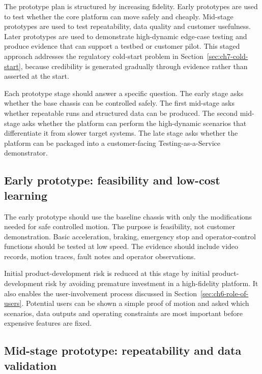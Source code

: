The prototype plan is structured by increasing fidelity. Early prototypes are used to test whether the core platform can move safely and cheaply. Mid-stage prototypes are used to test repeatability, data quality and customer usefulness. Later prototypes are used to demonstrate high-dynamic edge-case testing and produce evidence that can support a testbed or customer pilot. This staged approach addresses the regulatory cold-start problem in Section~\ref{sec:ch7-cold-start}, because credibility is generated gradually through evidence rather than asserted at the start.

Each prototype stage should answer a specific question. The early stage asks whether the base chassis can be controlled safely. The first mid-stage asks whether repeatable runs and structured data can be produced. The second mid-stage asks whether the platform can perform the high-dynamic scenarios that differentiate it from slower target systems. The late stage asks whether the platform can be packaged into a customer-facing Testing-as-a-Service demonstrator.

\subsection{Early prototype: feasibility and low-cost learning}
\label{sec:ch8_early_prototype}

The early prototype should use the baseline chassis with only the modifications needed for safe controlled motion. The purpose is feasibility, not customer demonstration. Basic acceleration, braking, emergency stop and operator-control functions should be tested at low speed. The evidence should include video records, motion traces, fault notes and operator observations.

Initial product-development risk is reduced at this stage by initial product-development risk by avoiding premature investment in a high-fidelity platform. It also enables the user-involvement process discussed in Section~\ref{sec:ch6-role-of-users}. Potential users can be shown a simple proof of motion and asked which scenarios, data outputs and operating constraints are most important before expensive features are fixed.

\subsection{Mid-stage prototype: repeatability and data validation}
\label{sec:ch8_mid_stage_repeatability}

